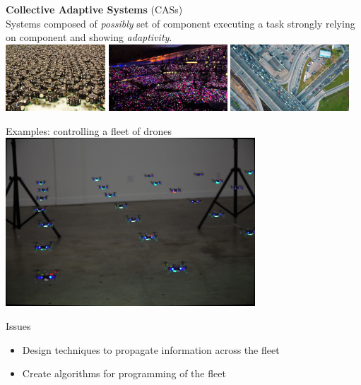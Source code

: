 \documentclass[presentation, 8pt]{beamer}\mode<presentation>{\usetheme{AMSBolognaFC}}
\begin{document}
\begin{frame}[plain,c]
	\begin{center}
	{\Huge \textbf{Collective Adaptive Systems} (CASs)}\\
	{\large Systems composed of \emph{possibly}  set of component executing a  task strongly relying on component  and showing  \emph{adaptivity}.}\\[0.3cm]
	\includegraphics[width=0.28\textwidth]{img/swarms.jpg}
	\includegraphics[width=0.333\textwidth]{img/coldplay.jpg}
	\includegraphics[width=0.333\textwidth]{img/traffic.jpg}	
	\end{center}
\end{frame}
\begin{frame}{Examples: controlling a fleet of drones}
\centering
\includegraphics[width=0.7\textwidth]{img/crazyflies}
\begin{alertblock}{Issues}
\begin{itemize}
	\item Design techniques to  propagate information across the fleet
	\item Create algorithms for  programming of the fleet
\end{itemize}
\end{alertblock}
\end{frame}
\end{document}
